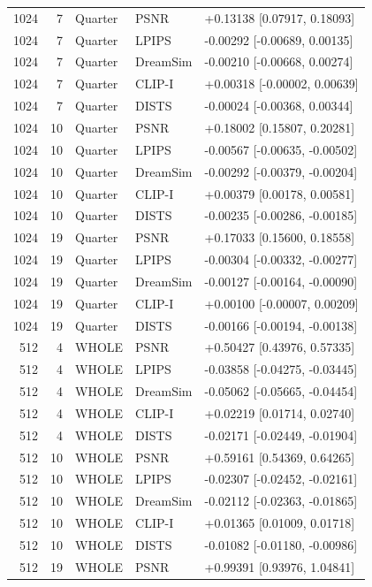 \documentclass[10pt,letterpaper]{article}
\begin{document}
\begin{longtable}{@{}rrlll@{}}
1024 & 7 & Quarter & PSNR & +0.13138 [0.07917, 0.18093]\\
1024 & 7 & Quarter & LPIPS & -0.00292 [-0.00689, 0.00135]\\
1024 & 7 & Quarter & DreamSim & -0.00210 [-0.00668, 0.00274]\\
1024 & 7 & Quarter & CLIP-I & +0.00318 [-0.00002, 0.00639]\\
1024 & 7 & Quarter & DISTS & -0.00024 [-0.00368, 0.00344]\\
1024 & 10 & Quarter & PSNR & +0.18002 [0.15807, 0.20281]\\
1024 & 10 & Quarter & LPIPS & -0.00567 [-0.00635, -0.00502]\\
1024 & 10 & Quarter & DreamSim & -0.00292 [-0.00379, -0.00204]\\
1024 & 10 & Quarter & CLIP-I & +0.00379 [0.00178, 0.00581]\\
1024 & 10 & Quarter & DISTS & -0.00235 [-0.00286, -0.00185]\\
1024 & 19 & Quarter & PSNR & +0.17033 [0.15600, 0.18558]\\
1024 & 19 & Quarter & LPIPS & -0.00304 [-0.00332, -0.00277]\\
1024 & 19 & Quarter & DreamSim & -0.00127 [-0.00164, -0.00090]\\
1024 & 19 & Quarter & CLIP-I & +0.00100 [-0.00007, 0.00209]\\
1024 & 19 & Quarter & DISTS & -0.00166 [-0.00194, -0.00138]\\
512 & 4 & WHOLE & PSNR & +0.50427 [0.43976, 0.57335]\\
512 & 4 & WHOLE & LPIPS & -0.03858 [-0.04275, -0.03445]\\
512 & 4 & WHOLE & DreamSim & -0.05062 [-0.05665, -0.04454]\\
512 & 4 & WHOLE & CLIP-I & +0.02219 [0.01714, 0.02740]\\
512 & 4 & WHOLE & DISTS & -0.02171 [-0.02449, -0.01904]\\
512 & 10 & WHOLE & PSNR & +0.59161 [0.54369, 0.64265]\\
512 & 10 & WHOLE & LPIPS & -0.02307 [-0.02452, -0.02161]\\
512 & 10 & WHOLE & DreamSim & -0.02112 [-0.02363, -0.01865]\\
512 & 10 & WHOLE & CLIP-I & +0.01365 [0.01009, 0.01718]\\
512 & 10 & WHOLE & DISTS & -0.01082 [-0.01180, -0.00986]\\
512 & 19 & WHOLE & PSNR & +0.99391 [0.93976, 1.04841]\\

\end{longtable}
\end{document}
